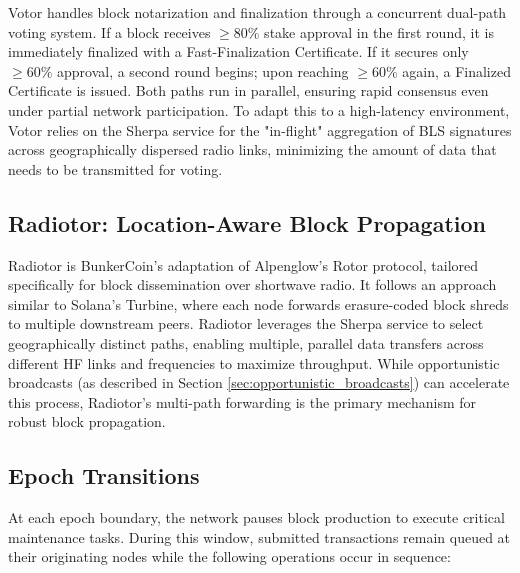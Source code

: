 \documentclass{article}
\begin{document}
Votor handles block notarization and finalization through a concurrent dual-path voting system. If a block receives $\geq 80\%$ stake approval in the first round, it is immediately finalized with a Fast-Finalization Certificate. If it secures only $\geq 60\%$ approval, a second round begins; upon reaching $\geq 60\%$ again, a Finalized Certificate is issued. Both paths run in parallel, ensuring rapid consensus even under partial network participation. To adapt this to a high-latency environment, Votor relies on the Sherpa service for the "in-flight" aggregation of BLS signatures across geographically dispersed radio links, minimizing the amount of data that needs to be transmitted for voting.

\subsection{Radiotor: Location-Aware Block Propagation}

Radiotor is BunkerCoin's adaptation of Alpenglow's Rotor protocol, tailored specifically for block dissemination over shortwave radio. It follows an approach similar to Solana's Turbine, where each node forwards erasure-coded block shreds to multiple downstream peers. Radiotor leverages the Sherpa service to select geographically distinct paths, enabling multiple, parallel data transfers across different HF links and frequencies to maximize throughput. While opportunistic broadcasts (as described in Section \ref{sec:opportunistic_broadcasts}) can accelerate this process, Radiotor's multi-path forwarding is the primary mechanism for robust block propagation.

\subsection{Epoch Transitions}
\label{sec:epoch_transitions}

At each epoch boundary, the network pauses block production to execute critical maintenance tasks. During this window, submitted transactions remain queued at their originating nodes while the following operations occur in sequence:
\end{document}

